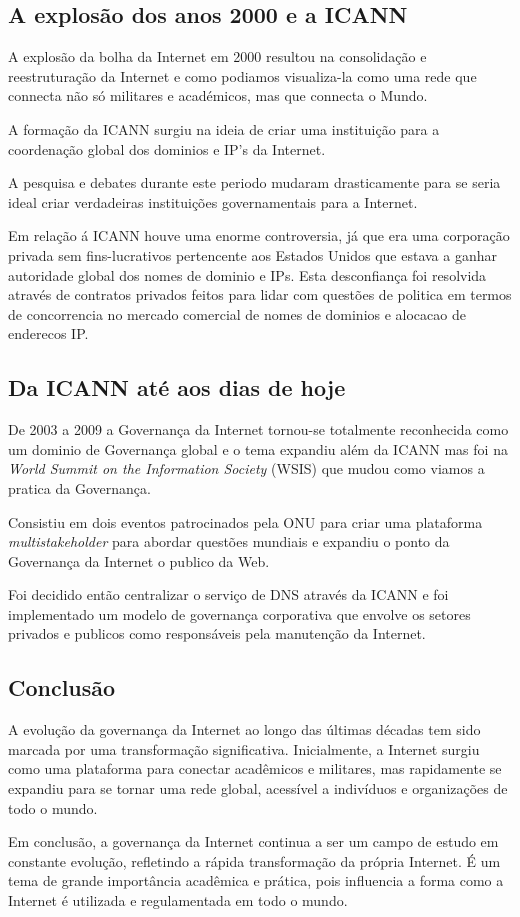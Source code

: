 \subsection{A explosão dos anos 2000 e a ICANN}
A explosão da bolha da Internet em 2000 resultou na consolidação e reestruturação da Internet
e como podiamos visualiza-la como uma rede que connecta não só militares e académicos, mas 
que connecta o Mundo.

A formação da ICANN surgiu na ideia de criar uma instituição para a coordenação global dos dominios
e IP's da Internet.

A pesquisa e debates durante este periodo mudaram drasticamente para se seria ideal 
criar verdadeiras instituições governamentais para a Internet.

Em relação á ICANN houve uma enorme controversia, já que era uma corporação privada sem
fins-lucrativos pertencente aos Estados Unidos que estava a ganhar autoridade global 
dos nomes de dominio e IPs. Esta desconfiança foi resolvida através de contratos privados
feitos para lidar com questões de politica em termos de concorrencia no mercado
comercial de nomes de dominios e alocacao de enderecos IP.

\subsection{Da ICANN até aos dias de hoje}
De 2003 a 2009 a Governança da Internet tornou-se totalmente reconhecida como um dominio 
de Governança global e o tema expandiu além da ICANN mas foi na \textit{World Summit on the Information Society} (WSIS)
que mudou como viamos a pratica da Governança.

Consistiu em dois eventos patrocinados pela ONU para criar uma plataforma \textit{multistakeholder}
para abordar questões mundiais e expandiu o ponto da Governança da Internet o publico
da Web. 

Foi decidido então centralizar o serviço de DNS através da ICANN e foi implementado um modelo de
governança corporativa que envolve os setores privados e publicos como responsáveis pela
manutenção da Internet.

\subsection{Conclusão}

A evolução da governança da Internet ao longo das últimas décadas tem sido marcada por 
uma transformação significativa. Inicialmente, a Internet surgiu como uma plataforma 
para conectar acadêmicos e militares, mas rapidamente se expandiu para se tornar uma rede 
global, acessível a indivíduos e organizações de todo o mundo.

Em conclusão, a governança da Internet continua a ser um campo de estudo em constante 
evolução, refletindo a rápida transformação da própria Internet. É um tema de grande
 importância acadêmica e prática, pois influencia a forma como a Internet é utilizada e 
 regulamentada em todo o mundo.